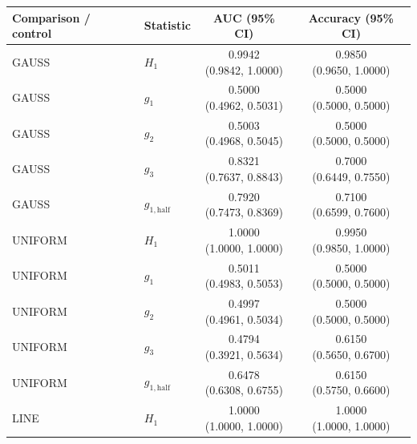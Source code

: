 \begin{tabular}{llcc}
\toprule
Comparison / control & Statistic & AUC (95\% CI) & Accuracy (95\% CI) \\
\midrule
GAUSS & $H_1$ & \shortstack{0.9942\\(0.9842, 1.0000)} & \shortstack{0.9850\\(0.9650, 1.0000)} \\[3pt]
GAUSS & $g_1$ & \shortstack{0.5000\\(0.4962, 0.5031)} & \shortstack{0.5000\\(0.5000, 0.5000)} \\[3pt]
GAUSS & $g_2$ & \shortstack{0.5003\\(0.4968, 0.5045)} & \shortstack{0.5000\\(0.5000, 0.5000)} \\[3pt]
GAUSS & $g_3$ & \shortstack{0.8321\\(0.7637, 0.8843)} & \shortstack{0.7000\\(0.6449, 0.7550)} \\[3pt]
GAUSS & $g_{1,\mathrm{half}}$ & \shortstack{0.7920\\(0.7473, 0.8369)} & \shortstack{0.7100\\(0.6599, 0.7600)} \\[3pt]
UNIFORM & $H_1$ & \shortstack{1.0000\\(1.0000, 1.0000)} & \shortstack{0.9950\\(0.9850, 1.0000)} \\[3pt]
UNIFORM & $g_1$ & \shortstack{0.5011\\(0.4983, 0.5053)} & \shortstack{0.5000\\(0.5000, 0.5000)} \\[3pt]
UNIFORM & $g_2$ & \shortstack{0.4997\\(0.4961, 0.5034)} & \shortstack{0.5000\\(0.5000, 0.5000)} \\[3pt]
UNIFORM & $g_3$ & \shortstack{0.4794\\(0.3921, 0.5634)} & \shortstack{0.6150\\(0.5650, 0.6700)} \\[3pt]
UNIFORM & $g_{1,\mathrm{half}}$ & \shortstack{0.6478\\(0.6308, 0.6755)} & \shortstack{0.6150\\(0.5750, 0.6600)} \\[3pt]
LINE & $H_1$ & \shortstack{1.0000\\(1.0000, 1.0000)} & \shortstack{1.0000\\(1.0000, 1.0000)} \\[3pt]

\end{tabular}
